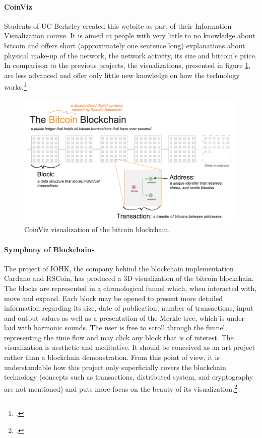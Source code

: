 \paragraph{CoinViz} Students of UC Berkeley created this website as part of their Information Visualization course. It is aimed at people with very little to no knowledge about bitcoin and offers short (approximately one sentence long) explanations about physical make-up of the network, the network activity, its size and bitcoin's price. In comparison to the previous projects, the visualizations, presented in figure \ref{fig:CoinViz}, are less advanced and offer only little new knowledge on how the technology works.\footcite[Cf.][]{GiudiciCoinViz2016}

\begin{figure}
    \centering
    \includegraphics[width=\linewidth]{latex-vorlage_v1.5/graphics/CoinViz.png}
    \caption[CoinViz visualization of the bitcoin blockchain.]{CoinViz visualization of the bitcoin blockchain.\protect\footnotemark}
    \label{fig:CoinViz}
\end{figure}

\paragraph{Symphony of Blockchains} The project of IOHK, the company behind the blockchain implementation Cardano and RSCoin, has produced a 3D visualization of the bitcoin blockchain. The blocks are represented in a chronological funnel which, when interacted with, move and expand. Each block may be opened to present more detailed information regarding its size, date of publication, number of transactions, input and output values as well as a presentation of the Merkle tree, which is under-laid with harmonic sounds. The user is free to scroll through the funnel, representing the time flow and may click any block that is of interest. The visualization is aesthetic and meditative. It should be conceived as an art project rather than a blockchain demonstration. From this point of view, it is understandable how this project only superficially covers the blockchain technology (concepts such as transactions, distributed system, and cryptography are not mentioned) and puts more focus on the beauty of its visualization.\footcite[Cf.][]{IOHKSymphonyBlockchains2018} 

